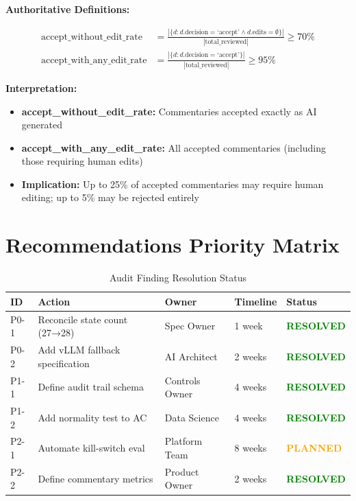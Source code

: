 \textbf{Authoritative Definitions:}

\begin{align}
\text{accept\_without\_edit\_rate} &= \frac{|\{d : d.\text{decision} = \text{`accept'} \land d.\text{edits} = \emptyset\}|}{|\text{total\_reviewed}|} \geq 70\% \\[1em]
\text{accept\_with\_any\_edit\_rate} &= \frac{|\{d : d.\text{decision} = \text{`accept'}\}|}{|\text{total\_reviewed}|} \geq 95\%
\end{align}

\textbf{Interpretation:}
\begin{itemize}
    \item \textbf{accept\_without\_edit\_rate:} Commentaries accepted exactly as AI generated
    \item \textbf{accept\_with\_any\_edit\_rate:} All accepted commentaries (including those requiring human edits)
    \item \textbf{Implication:} Up to 25\% of accepted commentaries may require human editing; 
          up to 5\% may be rejected entirely
\end{itemize}

\section{Recommendations Priority Matrix}
\label{sec:priority-matrix}

\begin{longtable}{p{1cm} p{5cm} p{3cm} p{2cm} p{1.5cm}}
\caption{Audit Finding Resolution Status} \\
\toprule
\textbf{ID} & \textbf{Action} & \textbf{Owner} & \textbf{Timeline} & \textbf{Status} \\
\midrule
\endfirsthead
\rowcolor{green!10}
P0-1 & Reconcile state count (27→28) & Spec Owner & 1 week & \textcolor{green}{\textbf{RESOLVED}} \\
\rowcolor{green!10}
P0-2 & Add vLLM fallback specification & AI Architect & 2 weeks & \textcolor{green}{\textbf{RESOLVED}} \\
\rowcolor{green!10}
P1-1 & Define audit trail schema & Controls Owner & 4 weeks & \textcolor{green}{\textbf{RESOLVED}} \\
\rowcolor{green!10}
P1-2 & Add normality test to AC & Data Science & 4 weeks & \textcolor{green}{\textbf{RESOLVED}} \\
\rowcolor{yellow!20}
P2-1 & Automate kill-switch eval & Platform Team & 8 weeks & \textcolor{orange}{\textbf{PLANNED}} \\
\rowcolor{green!10}
P2-2 & Define commentary metrics & Product Owner & 2 weeks & \textcolor{green}{\textbf{RESOLVED}} \\
\bottomrule
\end{longtable}

